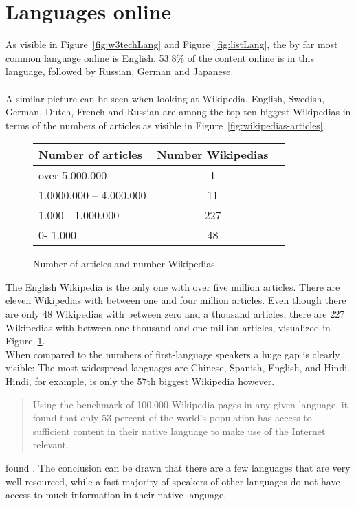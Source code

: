 \section{Languages online}

As visible in Figure~\ref{fig:w3techLang} and Figure~\ref{fig:listLang}, the by far most common language online is English. 53.8\% of the content online is in this language, followed by Russian, German and Japanese. \citep{w3techLang} \\
\\
A similar picture can be seen when looking at Wikipedia. English, Swedish, German, Dutch, French and Russian are among the top ten biggest Wikipedias in terms of the numbers of articles as visible in Figure~\ref{fig:wikipedias-articles}. \\
\begin{figure}[H]
\begin{center}
	\begin{tabular}{| l | c | r |}
		\hline			
		Number of articles & Number Wikipedias \\ \hline
		over 5.000.000 & 1 \\
		1.0000.000 -- 4.000.000 & 11 \\
		1.000 - 1.000.000 & 227 \\
		0- 1.000 & 48 \\
		\hline  
	\end{tabular}
	\end{center}
	\caption{Number of articles and number Wikipedias}
	\label{fig:tableNumWP}
\end{figure}

The English Wikipedia is the only one with over five million articles. There are eleven Wikipedias with between one and four million articles. Even though there are only 48 Wikipedias with between zero and a thousand articles, there are 227 Wikipedias with between one thousand and one million articles, visualized in Figure~\ref{fig:tableNumWP}. \citep{wiki:30} \\

When compared to the numbers of first-language speakers a huge gap is clearly visible: The most widespread languages are Chinese, Spanish, English, and Hindi. Hindi, for example, is only the 57th biggest Wikipedia however.
\begin{quote}
Using the benchmark of 100,000 Wikipedia pages in any given language, it found that only 53 percent of the world’s population has access to sufficient content in their native language to make use of the Internet relevant.
\end{quote} 
found \citet{atlanticLang}.
The conclusion can be drawn that there are a few languages that are very well resourced, while a fast majority of speakers of other languages do not have access to much information in their native language. 